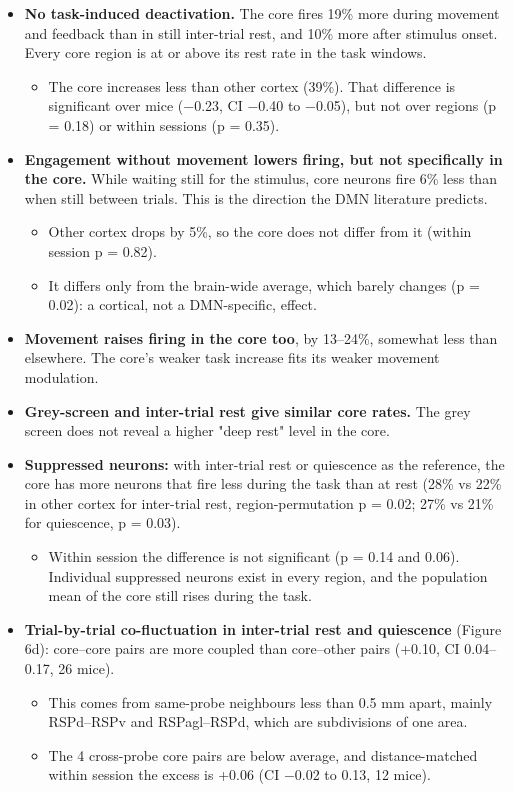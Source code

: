 \documentclass[10pt,a4paper]{article}
\begin{document}
\begin{itemize}
\item \textbf{No task-induced deactivation.} The core fires 19\% more during movement and feedback than in still inter-trial rest, and 10\% more after stimulus onset. Every core region is at or above its rest rate in the task windows. 
\begin{itemize}
\item The core increases less than other cortex (39\%). That difference is significant over mice ($-$0.23, CI $-$0.40 to $-$0.05), but not over regions (p = 0.18) or within sessions (p = 0.35).
\end{itemize}
\item \textbf{Engagement without movement lowers firing, but not specifically in the core.} While waiting still for the stimulus, core neurons fire 6\% less than when still between trials. This is the direction the DMN literature predicts. 
\begin{itemize}
\item Other cortex drops by 5\%, so the core does not differ from it (within session p = 0.82).
\item It differs only from the brain-wide average, which barely changes (p = 0.02): a cortical, not a DMN-specific, effect.
\end{itemize}
\item \textbf{Movement raises firing in the core too}, by 13--24\%, somewhat less than elsewhere. The core's weaker task increase fits its weaker movement modulation.
\item \textbf{Grey-screen and inter-trial rest give similar core rates.} The grey screen does not reveal a higher "deep rest" level in the core.
\item \textbf{Suppressed neurons:} with inter-trial rest or quiescence as the reference, the core has more neurons that fire less during the task than at rest (28\% vs 22\% in other cortex for inter-trial rest, region-permutation p = 0.02; 27\% vs 21\% for quiescence, p = 0.03). 
\begin{itemize}
\item Within session the difference is not significant (p = 0.14 and 0.06). Individual suppressed neurons exist in every region, and the population mean of the core still rises during the task.
\end{itemize}
\item \textbf{Trial-by-trial co-fluctuation in inter-trial rest and quiescence} (Figure 6d): core--core pairs are more coupled than core--other pairs (+0.10, CI 0.04--0.17, 26 mice). 
\begin{itemize}
\item This comes from same-probe neighbours less than 0.5 mm apart, mainly RSPd--RSPv and RSPagl--RSPd, which are subdivisions of one area.
\item The 4 cross-probe core pairs are below average, and distance-matched within session the excess is +0.06 (CI $-$0.02 to 0.13, 12 mice).
\end{itemize}
\end{itemize}
\end{document}
